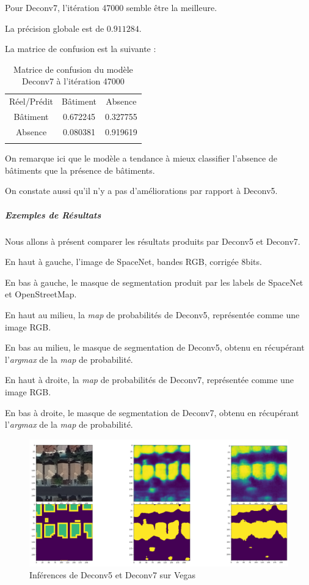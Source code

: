 \documentclass[a4paper, 11pt]{report}
\begin{document}
Pour Deconv7, l'itération 47000 semble être la meilleure.

La précision globale est de $0.911284$.

La matrice de confusion est la suivante :
\begin{table}[H]
	\centering
	\begin{tabularx}{0.5\textwidth}{c|c c|}
		Réel/Prédit & Bâtiment & Absence \\
		\hhline{---}
		Bâtiment & 0.672245 \cellcolor[gray]{.8} & 0.327755 \\
		Absence & 0.080381 & 0.919619 \cellcolor[gray]{.8}\\
		\hhline{~--}
	\end{tabularx}
	\caption{Matrice de confusion du modèle Deconv7 à l'itération 47000}
\end{table}

On remarque ici que le modèle a tendance à mieux classifier l'absence de bâtiments que la présence de bâtiments.

On constate aussi qu'il n'y a pas d'améliorations par rapport à Deconv5.

\subparagraph{Exemples de Résultats}
Nous allons à présent comparer les résultats produits par Deconv5 et Deconv7.

En haut à gauche, l'image de SpaceNet, bandes RGB, corrigée 8bits.

En bas à gauche, le masque de segmentation produit par les labels de SpaceNet et OpenStreetMap.

En haut au milieu, la \emph{map} de probabilités de Deconv5, représentée comme une image RGB.

En bas au milieu, le masque de segmentation de Deconv5, obtenu en récupérant l'\emph{argmax} de la \emph{map} de probabilité.

En haut à droite, la \emph{map} de probabilités de Deconv7, représentée comme une image RGB.

En bas à droite, le masque de segmentation de Deconv7, obtenu en récupérant l'\emph{argmax} de la \emph{map} de probabilité.

\begin{figure}[H]
	\centering
	\includegraphics[scale=0.225]{Images/Deconvs_Vegas.png}
	\caption{Inférences de Deconv5 et Deconv7 sur Vegas}
\end{figure}
\end{document}
